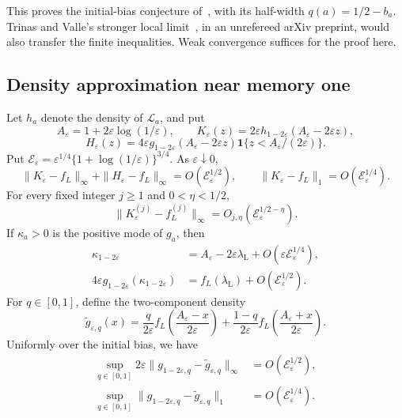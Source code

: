 This proves the initial-bias conjecture
of~\cite[Remark~2.1(b)]{glrs2025}, with its half-width $q(a)=1/2-b_a$.
Trinas and Valle's stronger local limit~\cite[Theorem~3.1]{tv2026},
in an unrefereed arXiv preprint, would also transfer the finite
inequalities. Weak convergence suffices for the proof here.



\subsection{Density approximation near memory one}

\begin{theorem}\label{thm:near-one-profile}
Let $h_a$ denote the density of $\mathcal L_a$, and put
\[
 A_\varepsilon=1+2\varepsilon\log(1/\varepsilon),\qquad
 K_\varepsilon(z)=2\varepsilon
       h_{1-2\varepsilon}(A_\varepsilon-2\varepsilon z),
\]
\[
 H_\varepsilon(z)=4\varepsilon
       g_{1-2\varepsilon}(A_\varepsilon-2\varepsilon z)
       \mathbf1\{z<A_\varepsilon/(2\varepsilon)\}.
\]
Put $\mathcal E_\varepsilon=\varepsilon^{1/4}
\{1+\log(1/\varepsilon)\}^{3/4}$. As $\varepsilon\downarrow0$,
\[
 \|K_\varepsilon-f_L\|_\infty+
 \|H_\varepsilon-f_L\|_\infty=O(\mathcal E_\varepsilon^{1/2}),
 \qquad \|K_\varepsilon-f_L\|_1=O(\mathcal E_\varepsilon^{1/4}).
\]
For every fixed integer $j\ge1$ and $0<\eta<1/2$,
\[
 \|K_\varepsilon^{(j)}-f_L^{(j)}\|_\infty
 =O_{j,\eta}(\mathcal E_\varepsilon^{1/2-\eta}).
\]
If $\kappa_a>0$ is the positive mode of $g_a$, then
\[
 \begin{aligned}
 \kappa_{1-2\varepsilon}
   &=A_\varepsilon-2\varepsilon\lambda_{\mathrm L}
       +O(\varepsilon\mathcal E_\varepsilon^{1/4}),\\
 4\varepsilon g_{1-2\varepsilon}(\kappa_{1-2\varepsilon})
   &=f_L(\lambda_{\mathrm L})+O(\mathcal E_\varepsilon^{1/2}).
 \end{aligned}
\]
For $q\in[0,1]$, define the two-component density
\[
 \widetilde g_{\varepsilon,q}(x)
 =\frac{q}{2\varepsilon}f_L\!\left(\frac{A_\varepsilon-x}{2\varepsilon}\right)
 +\frac{1-q}{2\varepsilon}f_L\!\left(\frac{A_\varepsilon+x}{2\varepsilon}\right).
\]
Uniformly over the initial bias, we have
\[
 \begin{aligned}
 \sup_{q\in[0,1]}2\varepsilon
     \|g_{1-2\varepsilon,q}-\widetilde g_{\varepsilon,q}\|_\infty
       &=O(\mathcal E_\varepsilon^{1/2}),\\
 \sup_{q\in[0,1]}
     \|g_{1-2\varepsilon,q}-\widetilde g_{\varepsilon,q}\|_1
       &=O(\mathcal E_\varepsilon^{1/4}).
 \end{aligned}
\]
\end{theorem}

